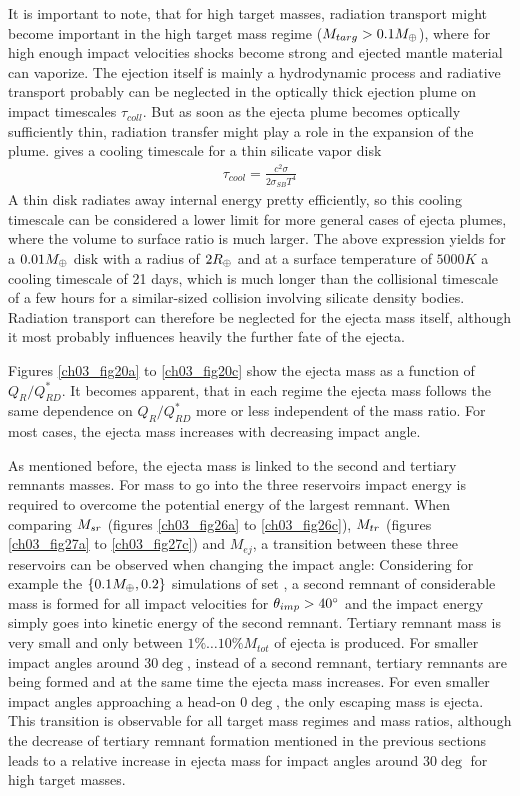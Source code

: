 It is important to note, that for high target masses, radiation transport might become important in the high target mass regime ($M_{targ} > 0.1 M_{\oplus}$), where for high enough impact velocities shocks become strong and ejected mantle material can vaporize. The ejection itself is mainly a hydrodynamic process and radiative transport probably can be neglected in the optically thick ejection plume on impact timescales $\tau_{coll}$. But as soon as the ejecta plume becomes optically sufficiently thin, radiation transfer might play a role in the expansion of the plume. \cite{Thompson:1988p3451} gives a cooling timescale for a thin silicate vapor disk 
\begin{align}
\tau_{cool} = \frac{c^2 \sigma}{ 2 \sigma_{SB} T^4}
\end{align}
A thin disk radiates away internal energy pretty efficiently, so this cooling timescale can be considered a lower limit for more general cases of ejecta plumes, where the volume to surface ratio is much larger. The above expression yields for a $0.01 M_{\oplus}$ disk with a radius of $2 R_{\oplus}$ and at a surface temperature of $5000K$ a cooling timescale of 21 days, which is much longer than the collisional timescale of a few hours for a similar-sized collision involving silicate density bodies. Radiation transport can therefore be neglected for the ejecta mass itself, although it most probably influences heavily the further fate of the ejecta.

Figures \ref{ch03_fig20a} to \ref{ch03_fig20c} show the ejecta mass as a function of $Q_{R} / Q_{RD}^*$. It becomes apparent, that in each regime the ejecta mass follows the same dependence on $Q_{R} / Q_{RD}^*$ more or less independent of the mass ratio. For most cases, the ejecta mass increases with decreasing impact angle. 

As mentioned before, the ejecta mass is linked to the second and tertiary remnants masses. For mass to go into the three reservoirs impact energy is required to overcome the potential energy of the largest remnant. When comparing $M_{sr}$ (figures \ref{ch03_fig26a} to \ref{ch03_fig26c}), $M_{tr}$ (figures \ref{ch03_fig27a} to \ref{ch03_fig27c}) and $M_{ej}$, a transition between these three reservoirs can be observed when changing the impact angle: Considering for example the $\{ 0.1M_{\oplus}, 0.2 \}$ simulations of set \css, a second remnant of considerable mass is formed for all impact velocities for $\theta_{imp} > 40 ^\circ$ and the impact energy simply goes into kinetic energy of the second remnant. Tertiary remnant mass is very small and only between $1 \% \dots 10\% M_{tot}$ of ejecta is produced. For smaller impact angles around $30 \deg$, instead of a second remnant, tertiary remnants are being formed and at the same time the ejecta mass increases. For even smaller impact angles approaching a head-on $0 \deg$, the only escaping mass is ejecta. This transition is observable for all target mass regimes and mass ratios, although the decrease of tertiary remnant formation mentioned in the previous sections leads to a relative increase in ejecta mass for impact angles around $30 \deg$ for high target masses.

